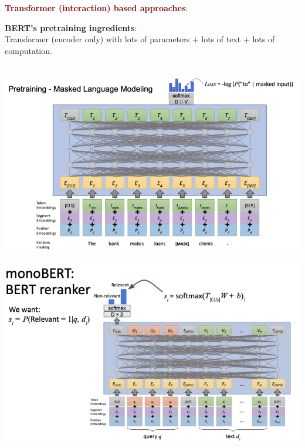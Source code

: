 \vspace{0.10cm}

\textbf{\textcolor{Maroon}{Transformer (interaction) based approaches}}:

\textbf{BERT's pretraining ingredients}: \\
Transformer (encoder only) with lots of parameters + lots of text + lots of computation. \\
\\
\begin{minipage}{0.5\textwidth}
\includegraphics[scale=0.5]{figures/bert1.png}
\end{minipage}
\begin{minipage}{0.5\textwidth}
\includegraphics[scale=0.5]{figures/bert2.png}
\end{minipage}

\vspace{1cm}

